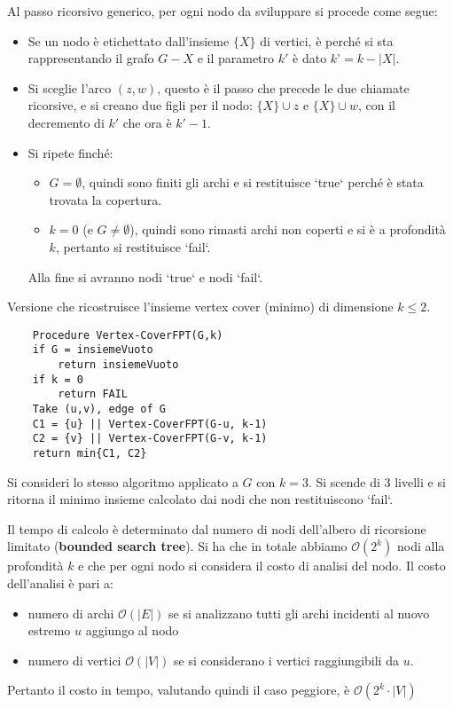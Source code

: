 Al passo ricorsivo generico, per ogni nodo da sviluppare si procede come segue: 
\begin{itemize}
    \item Se un nodo è etichettato dall’insieme $\{X\}$ di vertici, è perché si sta rappresentando il grafo $G-X$ e il parametro $k'$ è dato $k’ = k-|X|$. 
    \item Si sceglie  l’arco $(z,w)$, questo è il passo che precede le due chiamate ricorsive, e si creano due figli per il nodo: $\{X\} \cup z$ e $\{X\} \cup w$, con il decremento di $k'$ che ora è $k'-1$.
    \item Si ripete finché: 
        \begin{itemize}
            \item $G=\emptyset$, quindi sono finiti gli archi e si restituisce `true` perché è stata trovata la copertura. 
            \item $k=0$ (e $G \neq \emptyset$), quindi sono rimasti archi non coperti e si è a profondità $k$, pertanto si restituisce `fail`.
        \end{itemize}
        Alla fine si avranno nodi `true` e nodi `fail`. 
\end{itemize}
Versione che ricostruisce l’insieme vertex cover (minimo) di dimensione $k\leq 2$.

\begin{lstlisting}
    Procedure Vertex-CoverFPT(G,k)
    if G = insiemeVuoto 
    	return insiemeVuoto
    if k = 0
    	return FAIL
    Take (u,v), edge of G
    C1 = {u} || Vertex-CoverFPT(G-u, k-1)
    C2 = {v} || Vertex-CoverFPT(G-v, k-1)
    return min{C1, C2}
\end{lstlisting}

Si consideri lo stesso algoritmo applicato a $G$ con $k=3$. Si scende di $3$ livelli e si ritorna il minimo insieme calcolato dai nodi che non restituiscono `fail`.

Il tempo di calcolo è determinato dal numero di nodi dell'albero di ricorsione limitato (\textbf{bounded search tree}). Si ha che in totale abbiamo $\mathcal{O}(2^k)$ nodi alla profondità $k$ e che per ogni nodo si considera il costo di analisi del nodo. Il costo dell'analisi è pari a:
\begin{itemize}
    \item numero di archi $\mathcal{O}(|E|)$ se si analizzano tutti gli archi incidenti al nuovo estremo $u$ aggiungo al nodo
    \item numero di vertici  $\mathcal{O}(|V|)$ se si considerano i vertici raggiungibili da $u$. 
\end{itemize}
Pertanto il costo in tempo, valutando quindi il caso peggiore, è $\mathcal{O}(2^k \cdot |V|)$
